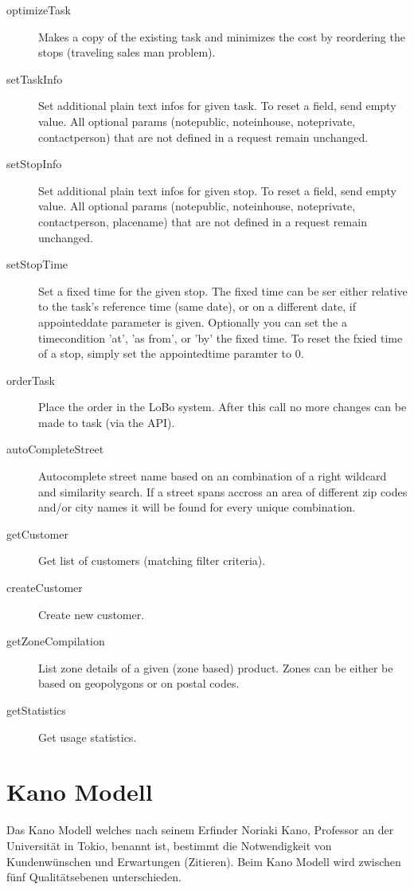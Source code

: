 \begin{description}
  \item[optimizeTask] Makes a copy of the existing task and minimizes the cost by reordering the stops (traveling sales man problem).
  \item[setTaskInfo] Set additional plain text infos for given task. To reset a field, send empty value. All optional params (notepublic, noteinhouse, noteprivate, contactperson) that are not defined in a request remain unchanged.
  \item[setStopInfo] Set additional plain text infos for given stop. To reset a field, send empty value. All optional params (notepublic, noteinhouse, noteprivate, contactperson, placename) that are not defined in a request remain unchanged.
  \item[setStopTime] Set a fixed time for the given stop. The fixed time can be ser either relative to the task's reference time (same date), or on a different date, if appointeddate parameter is given. Optionally you can set the a timecondition 'at', 'as from', or 'by' the fixed time. To reset the fxied time of a stop, simply set the appointedtime paramter to 0.
  \item[orderTask] Place the order in the LoBo system. After this call no more changes can be made to task (via the API).
  \item[autoCompleteStreet] Autocomplete street name based on an combination of a right wildcard and similarity search. If a street spans accross an area of different zip codes and/or city names it will be found for every unique combination.
  \item[getCustomer] Get list of customers (matching filter criteria).
  \item[createCustomer] Create new customer.
  \item[getZoneCompilation] List zone details of a given (zone based) product. Zones can be either be based on geopolygons or on postal codes.
  \item[getStatistics] Get usage statistics.
\end{description}

\newpage{}
\section{Kano Modell}
\label{sec:kanomodel}
Das Kano Modell welches nach seinem Erfinder Noriaki Kano, Professor an der Universität in Tokio, benannt ist, bestimmt die Notwendigkeit von Kundenwünschen und Erwartungen (Zitieren). Beim Kano Modell wird zwischen fünf Qualitätsebenen unterschieden.

